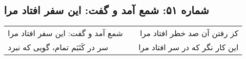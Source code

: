 \begin{center}
\section*{شماره ۵۱: شمع آمد و گفت: این سفر افتاد مرا}
\label{sec:051}
\begin{longtable}{l p{0.5cm} r}
شمع آمد و گفت: این سفر افتاد مرا
&&
کز رفتن آن صد خطر افتاد مرا
\\
سر در کَنَبَم تمام، گویی که نبرد
&&
این کار نگر که در سر افتاد مرا
\\
\end{longtable}
\end{center}
